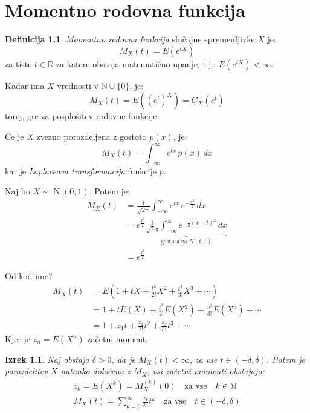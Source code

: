 \documentclass[12pt]{book}
\def\n{\noindent}
\theoremstyle{definition}
\newtheorem{definicija}{Definicija}
\theoremstyle{plain}
\newtheorem{izrek}{Izrek}
\theoremstyle{plain}
\theoremstyle{plain}
\theoremstyle{remark}
\begin{document}
\chapter{Momentno rodovna funkcija}

\begin{definicija}
    \emph{Momentno rodovna funkcija} slučajne spremenljivke $X$ je: 
    $$
    M_X(t)=E\left(e^{t  X}\right)
    $$
    za tiste $t \in \mathbb{R}$ za katere obstaja matematično upanje, t.j.: $E\left(e^{t X}\right)<\infty$.    
\end{definicija}

\n Kadar ima $X$ vrednosti v $\mathbb{N} \cup \{0\}$, je: 
$$
M_X(t)=E\left(\left(e^t\right)^X\right)=G_X\left(e^t\right)
$$
torej, gre za posplošitev rodovne funkcije. 

\n Če je $X$ zvezno porazdeljena z gostoto $p(x)$, je: 
$$
M_X(t)=\int_{-\infty}^{\infty} e^{t  x} \, p(x) \, d x
$$
kar je \emph{Laplaceova transformacija} funkcije $p$. 

\begin{zgled}
    Naj bo $X \sim \operatorname{N}(0,1)$. Potem je:
    $$
    \begin{aligned}
        M_X(t)&=\frac{1}{\sqrt{2 \pi}} \int_{-\infty}^{\infty} e^{t x} \, e^{-\frac{x^2}{2}} \,d x \\
        &=e^{\frac{t^2}{2}} \underbrace{\frac{1}{\sqrt{2} \pi} \int_{-\infty}^{\infty} e^{-\frac{1}{2}(x-t)^2} \, d x}_{\text {gostota za } N(t, 1)} \\
        &=e^{\frac{t^2}{2}}
    \end{aligned}
    $$
\end{zgled}

\n Od kod ime?
$$
\begin{aligned}
    M_X(t) & =E\left(1+t X+\frac{t^2}{2!} X^2+\frac{t^3}{3!} X^3+\cdots\right) \\
    & =1+t E(X)+\frac{t^2}{2!} E\left(X^2\right)+\frac{x^3}{3!} E\left(X^3\right) + \cdots \\
    & =1+z_1 t+\frac{z_2}{2!} t^2+\frac{z_3}{3!} t^3+\cdots
\end{aligned}
$$
Kjer je $z_n=E\left(X^n\right)$ začetni moment. 

\begin{izrek}
    Naj obstaja $\delta > 0$, da je $M_X(t)<\infty$, za vse $t \in(-\delta, \delta)$. Potem je porazdelitev $X$ natanko določena z $M_X$, vsi začetni momenti obstajajo: 
    $$
    \begin{aligned}
        & z_k=E\left(X^k\right)=M_X^{(k)}(0) \quad \text {za vse} \quad  k \in \mathbb{N} & \\
        & M_X(t)=\sum_{k=0}^{\infty} \frac{z_k}{k !} t^k \quad \text{za vse} \quad {t \in(-\delta, \delta)} &
    \end{aligned}
    $$
\end{izrek}
\end{document}
